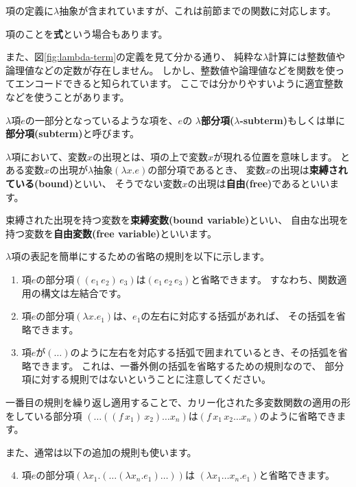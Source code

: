 項の定義に$\lambda$抽象が含まれていますが、これは前節までの関数に対応します。

項のことを\textbf{式}という場合もあります。

また、図\ref{fig:lambda-term}の定義を見て分かる通り、
純粋な$\lambda$計算には整数値や論理値などの定数が存在しません。
しかし、整数値や論理値などを関数を使ってエンコードできると知られています。
ここでは分かりやすいように適宜整数などを使うことがあります。

$\lambda$項$e$の一部分となっているような項を、$e$の
\textbf{$\lambda$部分項($\lambda$-subterm)}もしくは単に\textbf{部分項(subterm)}と呼びます。

$\lambda$項において、変数$x$の出現とは、項の上で変数$x$が現れる位置を意味します。
とある変数$x$の出現が$\lambda$抽象$(\lambda x . e)$の部分項であるとき、
変数$x$の出現は\textbf{束縛されている(bound)}といい、
そうでない変数$x$の出現は\textbf{自由(free)}であるといいます。

束縛された出現を持つ変数を\textbf{束縛変数(bound variable)}といい、
自由な出現を持つ変数を\textbf{自由変数(free variable)}といいます。

$\lambda$項の表記を簡単にするための省略の規則を以下に示します。

\begin{enumerate}
  \item 項$e$の部分項$((e_1 \, e_2) \, e_3)$は$(e_1 \, e_2 \, e_3)$と省略できます。
        すなわち、関数適用の構文は左結合です。
  \item 項$e$の部分項$(\lambda x . e_1)$は、$e_1$の左右に対応する括弧があれば、
        その括弧を省略できます。
  \item 項$e$が$(\dots)$のように左右を対応する括弧で囲まれているとき、その括弧を省略できます。
        これは、一番外側の括弧を省略するための規則なので、
        部分項に対する規則ではないということに注意してください。
\end{enumerate}

一番目の規則を繰り返し適用することで、カリー化された多変数関数の適用の形をしている部分項
$(\dots((f \, x_1) \, x_2) \dots x_n)$は$(f \, x_1 \, x_2 \dots x_n)$のように省略できます。

また、通常は以下の追加の規則も使います。

\begin{enumerate}
  \setcounter{enumi}{3}
  \item 項$e$の部分項$(\lambda x_1. (\dots (\lambda x_n . e_1) \dots))$は
       $(\lambda x_1 \dots x_n . e_1)$と省略できます。
\end{enumerate}


